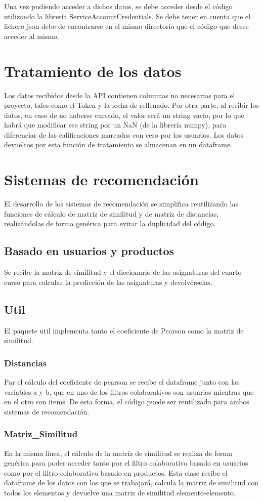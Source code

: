 Una vez pudiendo acceder a dichos datos, se debe acceder desde el código utilizando la librería ServiceAccountCredentials. Se debe tener en cuenta que el fichero json debe de encontrarse en el mismo directorio que el código que desee acceder al mismo. 


\section{Tratamiento de los datos}
Los datos recibidos desde la API contienen columnas no necesarias para el proyecto, tales como el Token y la fecha de rellenado. Por otra parte, al recibir los datos, en caso de no haberse cursado, el valor será un string vacío, por lo que habrá que modificar ese string por un NaN (de la librería numpy), para diferenciar de las calificaciones marcadas con cero por los usuarios.   Los datos devueltos por esta función de tratamiento se almacenan en un dataframe.

\section{Sistemas de recomendación}
El desarrollo de los sistemas de recomendación se simplifica reutilizando las funciones de cálculo de matriz de similitud y de matriz de distancias, realizándolas de forma genérica para evitar la duplicidad del código. 
\subsection{Basado en usuarios y productos}
Se recibe la matriz de similitud y el diccionario de las asignaturas del cuarto curso para calcular la predicción de las asignaturas y devolvérselas. 

\subsection{Util}
El paquete util implementa tanto el coeficiente de Pearson como la matriz de similitud. 
\subsubsection{Distancias}
Par el cálculo del coeficiente de pearson se recibe el dataframe junto con las variables a y b, que en uno de los filtros colaborativos son usuarios mientras que en el otro son items. De esta forma, el código puede ser reutilizado para ambos sistemas de recomendación. 
\subsubsection{Matriz\_Similitud}
En la misma línea, el cálculo de la matriz de similitud se realiza de forma genérica para poder acceder tanto por el filtro colaborativo basado en usuarios como por el filtro colaborativo basado en productos. Esta clase recibe el dataframe de los datos con los que se trabajará, calcula la matriz de similitud con todos los elementos y devuelve una matriz de similitud elemento-elemento. 

